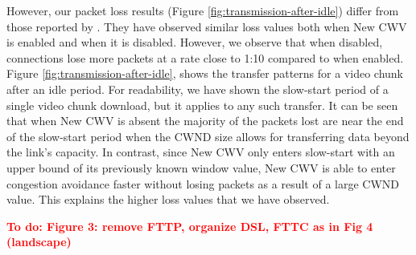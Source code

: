 \documentclass[10pt,sigconf,anonymous]{acmart}
\newcommand{\todo}[1]{\textbf{\textcolor{red}{To do: #1}}}
\begin{document}
However, our packet loss results (Figure \ref{fig:transmission-after-idle}) differ from those reported by \cite{Nazir-2014-performance-evaluation-congestion-window-validation-dash-newcwv}. They have observed similar loss values both when New CWV is enabled and when it is disabled. However, we observe that when disabled, connections lose more packets at a rate close to 1:10 compared to when enabled. Figure \ref{fig:transmission-after-idle}, shows the transfer patterns for a video chunk after an idle period. For readability, we have shown the slow-start period of a single video chunk download, but it applies to any such transfer. It can be seen that when New CWV is absent the majority of the packets lost are near the end of the slow-start period when the CWND size allows for transferring data beyond the link's capacity. In contrast, since New CWV only enters slow-start with an upper bound of its previously known window value, New CWV is able to enter congestion avoidance faster without losing packets as a result of a large CWND value. This explains the higher loss values that we have observed.


\todo{Figure 3: remove FTTP, organize DSL, FTTC as in Fig 4 (landscape)}
\end{document}
